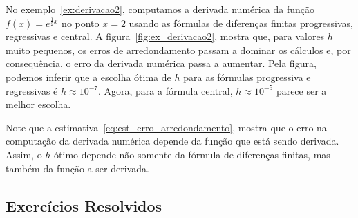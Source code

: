 \begin{ex}
No exemplo~\ref{ex:derivacao2}, computamos a derivada numérica da função $f(x)=e^{\frac{1}{2}x}$ no ponto $x=2$ usando as fórmulas de diferenças finitas progressivas, regressivas e central. A figura~\ref{fig:ex_derivacao2}, mostra que, para valores $h$ muito pequenos, os erros de arredondamento passam a dominar os cálculos e, por consequência, o erro da derivada numérica passa a aumentar. Pela figura, podemos inferir que a escolha ótima de $h$ para as fórmulas progressiva e regressivas é $h\approx 10^{-7}$. Agora, para a fórmula central, $h\approx 10^{-5}$ parece ser a melhor escolha.
\end{ex}

\begin{obs}
  Note que a estimativa~\eqref{eq:est_erro_arredondamento}, mostra que o erro na computação da derivada numérica depende da função que está sendo derivada. Assim, o $h$ ótimo depende não somente da fórmula de diferenças finitas, mas também da função a ser derivada.
\end{obs}

\subsection*{Exercícios Resolvidos}

